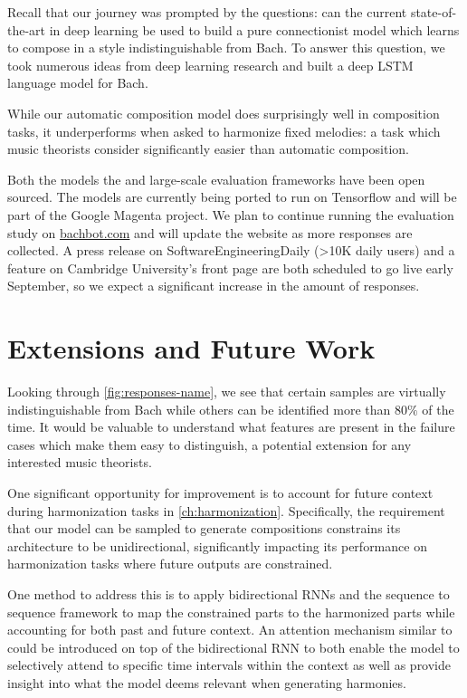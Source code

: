 Recall that our journey was prompted by the questions: can the current
state-of-the-art in deep learning be used to build a pure connectionist
model which learns to compose in a style indistinguishable from Bach. To
answer this question, we took numerous ideas from deep learning research
and built a deep LSTM language model for Bach.

While our automatic composition model does surprisingly well in composition
tasks, it underperforms when asked to harmonize fixed melodies: a task which
music theorists consider significantly easier than automatic composition.

Both the models the and large-scale evaluation frameworks have been open
sourced. The models are currently being ported to run on Tensorflow and will be
part of the Google Magenta project. We plan to continue running the evaluation
study on \url{bachbot.com} and will update the website as more responses are
collected. A press release on SoftwareEngineeringDaily (>10K daily users) and a
feature on Cambridge University's front page are both scheduled to go live
early September, so we expect a significant increase in the amount of
responses.

\section{Extensions and Future Work}\label{sec:future-work}

Looking through \vref{fig:responses-name}, we see that certain
samples are virtually indistinguishable from Bach while others
can be identified more than $80\%$ of the time. It would be valuable
to understand what features are present in the failure cases which
make them easy to distinguish, a potential extension for any
interested music theorists.

One significant opportunity for improvement is to account for future context
during harmonization tasks in \cref{ch:harmonization}. Specifically, the
requirement that our model can be sampled to generate compositions constrains
its architecture to be unidirectional, significantly impacting its performance
on harmonization tasks where future outputs are constrained.

One method to address this is to apply bidirectional RNNs\citep{Graves2005} and
the sequence to sequence framework\citep{sutskever2014sequence} to map the
constrained parts to the harmonized parts while accounting for both past and
future context. An attention mechanism similar to \citet{Bahdanau2015} could be
introduced on top of the bidirectional RNN to both enable the model to
selectively attend to specific time intervals within the context as well as
provide insight into what the model deems relevant when generating harmonies.


